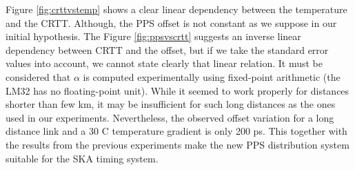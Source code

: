 Figure \ref{fig:crttvstemp} shows a clear linear dependency between the 
temperature and the CRTT. Although, the PPS offset is not constant as 
we suppose in our initial hypothesis. The Figure \ref{fig:ppsvscrtt} suggests 
an inverse linear dependency between CRTT and the offset, but if we take the 
standard error values into account, we cannot state clearly that linear 
relation. It must be considered that $\alpha$ is computed experimentally using 
fixed-point arithmetic (the LM32 has no floating-point unit). While it seemed 
to work properly for distances shorter than few km, it may be insufficient 
for such long distances as the ones used in our experiments. Nevertheless, the 
observed offset variation for a long distance link and a 30 \degree C temperature 
gradient is only 200 ps. This together with the results from the previous 
experiments make the new PPS distribution system suitable for the SKA 
timing system.